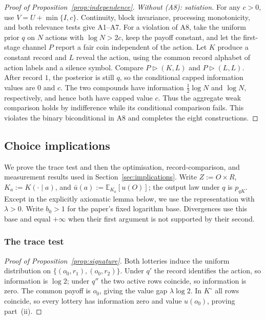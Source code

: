 \documentclass[11pt,a4paper]{article}
\theoremstyle{definition}
\newcommand{\E}{\mathbb E}
\newcommand{\1}{\mathbf 1}
\begin{document}
\begin{proof}[Proof of Proposition~\ref{prop:independence}]
\emph{Without \textup{(A8)}: satiation.}
For any $c>0$, use $V=U+\min\{I,c\}$.  Continuity, block invariance,
processing monotonicity, and both relevance tests give A1--A7.
For a violation of A8, take the uniform prior $q$ on $N$ actions with
$\log N>2c$, keep the payoff constant, and let the first-stage channel $P$
report a fair coin independent of the action.  Let $K$ produce a constant record and $L$
reveal the action, using the common record alphabet of action labels and a
silence symbol.  Compare $P\triangleright(K,L)$ and $P\triangleright(L,L)$.
After record $1$, the posterior is still $q$, so the conditional capped
information values are $0$ and $c$.  The two compounds have information
$\tfrac12\log N$ and $\log N$, respectively, and hence both have capped
value $c$.  Thus the aggregate weak comparison holds by indifference while
its conditional comparison fails.  This violates the binary biconditional
in A8 and completes the eight constructions.
\end{proof}

\subsection{Choice implications}\label{app:choice-proofs}

We prove the trace test and then the optimisation, record-comparison, and
measurement results used in Section~\ref{sec:implications}.  Write
$Z:=O\times R$, $K_a:=K(\cdot\mid a)$, and
$\bar u(a):=\E_{K_a}[u(O)]$; the output law under $q$ is $p_{qK}$.
Except in the explicitly axiomatic lemma below, we use the representation
with $\lambda>0$.  Write $b_0>1$ for the paper's fixed logarithm base.
Divergences use this base and
equal $+\infty$ when their first argument is not supported by their second.

\subsubsection{The trace test}\label{app:trace-test-proof}

\begin{proof}[Proof of Proposition~\ref{prop:signature}]
Both lotteries induce the uniform distribution on
$\{(o_0,r_1),(o_0,r_2)\}$.  Under $q'$ the record identifies the action, so
information is $\log2$; under $q''$ the two active rows coincide, so
information is zero.  The common payoff is $o_0$, giving the value gap
$\lambda\log2$.  In $K^\circ$ all rows coincide, so every lottery has
information zero and value $u(o_0)$, proving part~\textup{(ii)}.
\end{proof}
\end{document}
